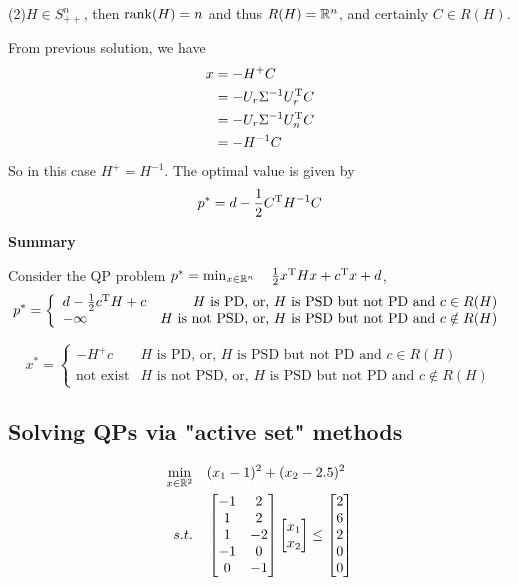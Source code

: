 (2)$H\in S^n_{++}$, then $\operatorname{rank}(H) = n$ and thus $R(H)=\mathbb{R}^n$, and certainly $C \in R(H)$.

From previous solution, we have
\begin{align*}
x 
&= -H^{+}C\\
&= -U_r \Sigma^{-1} U_r^{{\rm T}} C\\
&= -U_r \Sigma^{-1} U_n^{{\rm T}} C\\
&= - H^{-1} C
\end{align*}
So in this case $H^+ = H^{-1}$. The optimal value is given by
$$p^* = d - \frac{1}{2}C^{{\rm T}}H^{-1}C$$


\textbf{Summary }

Consider the QP problem $p^* = \min_{x\in \mathbb{R}^n}\quad \frac{1}{2}x^{{\rm T}}Hx + c^{{\rm T}}x + d$,
\begin{equation}
p^* = \left\{
\begin{array}{lr}
d - \frac{1}{2}c^{{\rm T}}H+c &\text{$H$ is PD, or, $H$ is PSD but not PD and $c \in R(H)$}\\
-\infty &\text{$H$ is not PSD, or, $H$ is PSD but not PD and $c\notin R(H)$}
\end{array}
\right.\nonumber
\end{equation}

\begin{equation}
x^* = \left\{
\begin{array}{lr}
-H^+c &\text{$H$ is PD, or, $H$ is PSD but not PD and $c \in R(H)$}\\
\text{not exist} &\text{$H$ is not PSD, or, $H$ is PSD but not PD and $c\notin R(H)$}
\end{array}
\right.\nonumber
\end{equation}

\vspace{0.5cm}
\subsection{Solving QPs via "active set" methods}

\begin{align*}
\min_{x\in \mathbb{R}^2} \quad & (x_1 - 1)^2 + (x_2 - 2.5)^2 \\
s.t. \quad&
\begin{bmatrix}
-1&2\\
1&2\\
1&-2\\
-1&0\\
0&-1
\end{bmatrix}
\begin{bmatrix}
x_1\\
x_2
\end{bmatrix}
\leq
\begin{bmatrix}
2\\
6\\
2\\
0\\
0
\end{bmatrix}
\end{align*}

